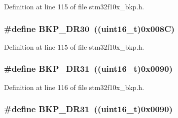 Definition at line 115 of file stm32f10x\+\_\+bkp.\+h.

\subsubsection[{\texorpdfstring{B\+K\+P\+\_\+\+D\+R30}{BKP_DR30}}]{\setlength{\rightskip}{0pt plus 5cm}\#define B\+K\+P\+\_\+\+D\+R30~(({\bf uint16\+\_\+t})0x008\+C)}\hypertarget{group___data___backup___register_ga7114464779c0f0e008ec79f66aac9568}{}\label{group___data___backup___register_ga7114464779c0f0e008ec79f66aac9568}


Definition at line 115 of file stm32f10x\+\_\+bkp.\+h.

\subsubsection[{\texorpdfstring{B\+K\+P\+\_\+\+D\+R31}{BKP_DR31}}]{\setlength{\rightskip}{0pt plus 5cm}\#define B\+K\+P\+\_\+\+D\+R31~(({\bf uint16\+\_\+t})0x0090)}\hypertarget{group___data___backup___register_gadb5b953e765da9d658600151dde63fa3}{}\label{group___data___backup___register_gadb5b953e765da9d658600151dde63fa3}


Definition at line 116 of file stm32f10x\+\_\+bkp.\+h.

\subsubsection[{\texorpdfstring{B\+K\+P\+\_\+\+D\+R31}{BKP_DR31}}]{\setlength{\rightskip}{0pt plus 5cm}\#define B\+K\+P\+\_\+\+D\+R31~(({\bf uint16\+\_\+t})0x0090)}\hypertarget{group___data___backup___register_gadb5b953e765da9d658600151dde63fa3}{}\label{group___data___backup___register_gadb5b953e765da9d658600151dde63fa3}


